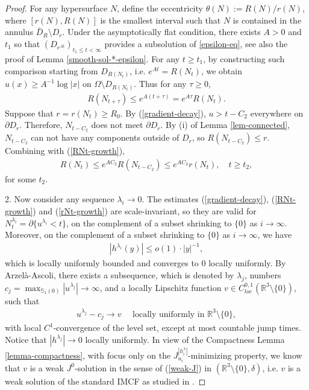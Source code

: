 \documentclass[11pt, letterpaper]{amsart}
\theoremstyle{definition}
\theoremstyle{remark}
\begin{document}
\begin{appendix}
\begin{proof}
	For any hypersurface $N$, define the eccentricity $\theta (N) := R(N) / r(N)$, where $[r(N), R(N)]$ is the smallest interval such that $N$ is contained in the annulus $\bar{D}_{R} \setminus D_r$. Under the asymptotically flat condition, there exists $A>0$ and $t_1$ so that $(D_{e ^{A t}})_{t_1 \leq t< \infty}$ provides a subsolution of \ref{epsilon-eq}, see also the proof of Lemma \ref{smooth-sol-*-epsilon}. For any $t \geq t_1$, by constructing such comparison starting from $D_{R(N_t)}$, i.e. $e ^{A t} = R(N_t)$, we obtain $u(x) \geq A ^{-1} \log |x|$ on $\Omega \setminus D_{R(N_t)}$. Thus for any $\tau \geq 0$,
	\begin{align}\label{RNt-growth}
		R(N_{t+ \tau }) \leq e ^{A(t+ \tau )} = e ^{A \tau } R(N_t).
	\end{align}
	Suppose that $r = r(N_t) \geq R_0$. By (\ref{gradient-decay}), $u > t - C_2$ everywhere on $\partial D_r$. Therefore, $N_{t- C_2}$ does not meet $\partial D_r$. By (i) of Lemma \ref{lem-connected}, $N_{t- C_2}$ can not have any components outside of $D_r$, so $R(N_{t- C_2}) \leq r$. Combining with (\ref{RNt-growth}), 
	\begin{align}\label{rNt-growth}
		R(N_t) \leq e ^{A C_2} R(N_{t- C_2}) \leq e ^{A C_2} r(N_t),\quad t \geq t_2,
	\end{align}
	for some $t_2$.

	2. Now consider any sequence $\lambda _i \to 0$. The estimates (\ref{gradient-decay}), (\ref{RNt-growth}) and (\ref{rNt-growth}) are scale-invariant, so they are valid for $N^{\lambda _i}_{t} = \partial \{ u ^{\lambda _i} < t\} $, on the complement of a subset shrinking to $\{0\} $ as $i \to \infty$. Moreover, on the complement of a subset shrinking to $\{0\} $ as $i \to \infty$, we have 
	\begin{align*}
		|h ^{\lambda _i}(y)| \leq o(1) \cdot  |y| ^{-1},
	\end{align*} 
	which is locally uniformly bounded and converges to $0$ locally uniformly.
	By Arzel\`a-Ascoli, there exists a subsequence, which is denoted by $\lambda _j$, numbers $c_j = \max_{\mathbb{S}_1(0)}|u ^{\lambda _j}| \to \infty$, and a locally Lipschitz function $v \in C ^{0,1}_{loc}(\mathbb{R}^3 \setminus \{ 0\} )$, such that
	\begin{align*}
		u ^{\lambda _j} - c_j \to v \quad \text{ locally uniformly in } \mathbb{R}^{3} \setminus \{0\},
	\end{align*}
	with local $C^1$-convergence of the level set, except at most countable jump times. Notice that $|h ^{\lambda _j}| \to 0$ locally uniformly. In view of the Compactness Lemma \ref{lemma-compactness}, with focus only on the $J^{|h ^{\lambda }_i|}_{u_i}$-minimizing property, we know that $v$ is a weak $J^{0}$-solution in the sense of (\ref{weak-J}) in $(\mathbb{R}^{3}\setminus \{0\} , \delta )$, i.e. $v$ is a weak solution of the standard IMCF as studied in \cite{HI01}.



\end{proof}
\end{appendix}
\end{document}
